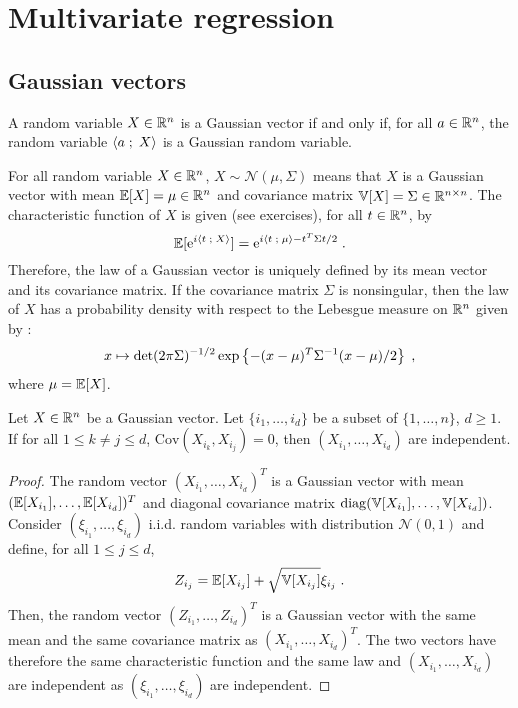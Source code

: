\chapter{Multivariate regression}
\minitoc
\begin{kwd}

\end{kwd}

\section{Gaussian vectors}

\begin{shaded}
\begin{definition}
\label{def:gauss:vec}
A random variable $X\in\mathbb{R}^n$ is a Gaussian vector if and only if, for all $a\in\mathbb{R}^n$, the random variable $\langle a\;;\; X\rangle$ is a Gaussian random variable.
\end{definition}
\end{shaded}
For all random variable $X\in\mathbb{R}^n$,  $X\sim \mathcal{N}(\mu,\Sigma)$ means that $X$ is a Gaussian vector with mean $\mathbb{E}[X] = \mu\in\mathbb{R}^n$ and covariance matrix $\mathbb{V}[X] = \Sigma\in\mathbb{R}^{n\times n}$. The characteristic function of $X$ is given (see exercises), for all $t\in\mathbb{R}^n$, by
\[
\mathbb{E}[\mathrm{e}^{i\langle t\;;\; X\rangle}] = \mathrm{e}^{i\langle t\;;\; \mu\rangle - t^T\Sigma t /2}\;.
\]
Therefore, the law of a Gaussian vector is uniquely defined by its mean vector and its covariance matrix.
If the covariance matrix $\Sigma$ is nonsingular, then the law of $X$ has a probability density with respect to the Lebesgue measure on $\mathbb{R}^n$ given by : 
\[
x\mapsto \mathrm{det}(2\pi \Sigma)^{-1/2} \exp\left\{-(x-\mu)^T\Sigma^{-1}(x-\mu)/2\right\}\;,
\]
where $\mu = \mathbb{E}[X]$.

\begin{shaded}
\begin{proposition}
\label{prop:gauss:vec:decor}
Let $X\in\mathbb{R}^n$ be a Gaussian vector. Let $\{i_1,\ldots,i_d\}$ be a subset of $\{1,\ldots,n\}$, $d\geqslant 1$. If for all $1\leqslant k\neq j \leqslant d$, $\mathrm{Cov}(X_{i_k},X_{i_j}) = 0$, then $(X_{i_1},\ldots,X_{i_d})$ are independent.
\end{proposition}
\end{shaded}
\begin{proof}
The random vector $(X_{i_1},\ldots,X_{i_d})^T$ is a Gaussian vector with mean $(\mathbb{E}[X_{i_1}],\ldots,\mathbb{E}[X_{i_d}])^T$ and diagonal covariance matrix $\mathrm{diag}(\mathbb{V}[X_{i_1}],\ldots,\mathbb{V}[X_{i_d}])$. Consider $(\xi_{i_1},\ldots,\xi_{i_d})$ i.i.d. random variables with distribution $\mathcal{N}(0,1)$ and define, for all $1\leqslant j \leqslant d$,
\[
Z_{i_j} = \mathbb{E}[X_{i_j}]  + \sqrt{\mathbb{V}[X_{i_j}]}\xi_{i_j}\;.
\]
Then, the random vector $(Z_{i_1},\ldots,Z_{i_d})^T$ is a Gaussian vector with the same mean and the same covariance matrix as $(X_{i_1},\ldots,X_{i_d})^T$. The two vectors have therefore the same characteristic function and the same law and $(X_{i_1},\ldots,X_{i_d})$  are independent as  $(\xi_{i_1},\ldots,\xi_{i_d})$ are independent.
\end{proof}

